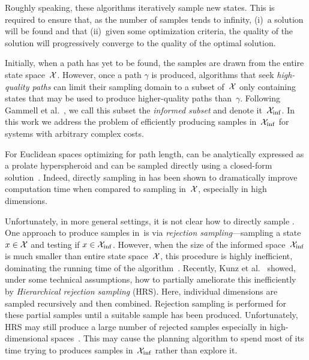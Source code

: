 \documentclass[letterpaper, 10 pt, conference]{ieeeconf}  %
\begin{document}
Roughly speaking, these algorithms iteratively sample new states.
This is required to ensure that, as the number of samples tends to infinity, 
(i)~a solution will be found 
and that
(ii)~given some optimization criteria, the quality of the solution will progressively converge to the quality of the optimal solution.

Initially, 
when a path has yet to be found, 
the samples are drawn from the entire state space~$\mathcal{X}$.
However, once a path $\gamma$ is produced,  algorithms that seek \emph{high-quality paths} can limit their sampling domain to a subset of~$\mathcal{X}$ only  containing states that may be used to produce higher-quality paths than~$\gamma$.
Following Gammell et al.~\cite{GSB14}, we call this subset the \emph{informed subset} and denote it~$\mathcal{X}_{\rm {inf}}$.
In this work we address the problem of efficiently producing samples in~$\mathcal{X}_{\rm {inf}}$ for systems with arbitrary complex costs. 

For Euclidean spaces optimizing for path length, 
\Cinf can be analytically expressed as a prolate hyperspheroid and can be sampled directly using a closed-form solution~\cite{GSB14}.
Indeed, directly sampling in \Cinf has been shown to dramatically improve computation time when compared to sampling in~$\mathcal{X}$, especially in high dimensions. 

Unfortunately, in more general settings,
it is not clear how to directly sample \Cinf.
%
One approach to produce samples in~\Cinf is via \emph{rejection sampling}---sampling a state $x \in \mathcal{X}$ and testing if $x \in \mathcal{X}_{\rm {inf}}$.
However, when the size of the informed space~$\mathcal{X}_{\rm {inf}}$ is much smaller than entire state space~$\mathcal{X}$, this procedure is highly inefficient, dominating the running time of the algorithm~\cite{KTC16}.
Recently, Kunz et al.~\cite{KTC16} showed, under some technical assumptions, how to partially ameliorate this inefficiently by \emph{Hierarchical rejection sampling} (HRS). 
Here, individual dimensions are sampled recursively 
and then combined. Rejection sampling is performed for these partial samples until a suitable sample has been produced. 
Unfortunately, HRS may still produce a large number of rejected samples especially in high-dimensional spaces~\cite{KTC16}.
This may cause the planning algorithm to spend most of its time trying to produces samples in~$\mathcal{X}_{\rm {inf}}$ rather than explore it.
\end{document}
